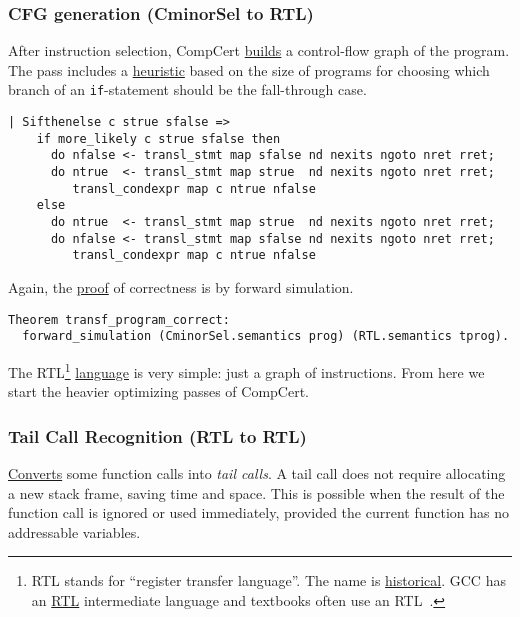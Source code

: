 \subsubsection{CFG generation (CminorSel to RTL)}
After instruction selection, CompCert \href{https://github.com/AbsInt/CompCert/blob/master/backend/RTLgen.v}{builds} a control-flow graph of the program.
The pass includes a \href{https://github.com/AbsInt/CompCert/blob/master/backend/RTLgenaux.ml}{heuristic} based on the size of programs for choosing which branch of an \lstinline{if}-statement should be the fall-through case.
\begin{lstlisting}[style=Coq]
| Sifthenelse c strue sfalse =>
    if more_likely c strue sfalse then
      do nfalse <- transl_stmt map sfalse nd nexits ngoto nret rret;
      do ntrue  <- transl_stmt map strue  nd nexits ngoto nret rret;
         transl_condexpr map c ntrue nfalse
    else
      do ntrue  <- transl_stmt map strue  nd nexits ngoto nret rret;
      do nfalse <- transl_stmt map sfalse nd nexits ngoto nret rret;
         transl_condexpr map c ntrue nfalse
\end{lstlisting}
Again, the \href{https://github.com/AbsInt/CompCert/blob/master/backend/RTLgenproof.v#L1578}{proof} of correctness is by forward simulation.
\begin{lstlisting}[style=Coq]
Theorem transf_program_correct:
  forward_simulation (CminorSel.semantics prog) (RTL.semantics tprog).
\end{lstlisting}

The RTL\footnote{RTL stands for ``register transfer language''. The name is \href{http://www.well.com/~cwf/pro/Davidson\%20and\%20Fraser.\%20The\%20design\%20and\%20application\%20of\%20a\%20retargetable\%20peephole\%20optimizer.pdf}{historical}.
                 GCC has an \href{http://gcc.gnu.org/onlinedocs/gccint/RTL.html}{RTL} intermediate language and textbooks often use an RTL~\cite{munchnik}.}
  \href{https://github.com/AbsInt/CompCert/blob/master/backend/RTL.v#L47}{language}
 is very simple: just a graph of instructions.
From here we start the heavier optimizing passes of CompCert.


\subsubsection{Tail Call Recognition (RTL to RTL)}
\href{https://github.com/AbsInt/CompCert/blob/master/backend/Tailcall.v}{Converts} some function calls into \emph{tail calls}.
A tail call does not require allocating a new stack frame, saving time and space.
This is possible when the result of the function call is ignored or used immediately, provided the current function has no addressable variables.

